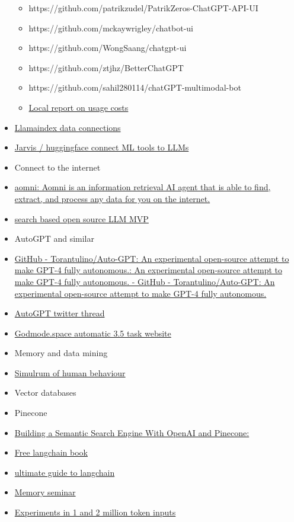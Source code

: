\begin{itemize}
  \begin{itemize}
   
  \item
    https://github.com/patrikzudel/PatrikZeros-ChatGPT-API-UI
  \item
    https://github.com/mckaywrigley/chatbot-ui
  \item
    https://github.com/WongSaang/chatgpt-ui
  \item
    https://github.com/ztjhz/BetterChatGPT
  \item
    https://github.com/sahil280114/chatGPT-multimodal-bot
  \item
    \href{https://llm.report/}{Local report on usage costs}
  \end{itemize}
\item
  \href{https://github.com/jerryjliu/llama_index}{Llamaindex data
  connections}
\item
  \href{https://arxiv.org/pdf/2303.17580.pdf}{Jarvis / huggingface
  connect ML tools to LLMs}
\item
  Connect to the internet
\item
  \href{https://www.aomni.com/}{aomni: Aomni is an information retrieval
  AI agent that is able to find, extract, and process any data for you
  on the internet.}
\item
  \href{https://github.com/michaelthwan/searchGPT}{search based open
  source LLM MVP}
\item
  AutoGPT and similar
\item
  \href{https://github.com/Torantulino/Auto-GPT}{GitHub -
  Torantulino/Auto-GPT: An experimental open-source attempt to make
  GPT-4 fully autonomous.: An experimental open-source attempt to make
  GPT-4 fully autonomous. - GitHub - Torantulino/Auto-GPT: An
  experimental open-source attempt to make GPT-4 fully autonomous.}
\item
  \href{https://mobile.twitter.com/SullyOmarr/status/1645482778677452805}{AutoGPT
  twitter thread}
\item
  \href{https://godmode.space/}{Godmode.space automatic 3.5 task
  website}
\item
  Memory and data mining
\item
  \href{https://arxiv.org/abs/2304.03442}{Simulrum of human behaviour}
\item
  Vector databases
\item
  Pinecone
\item
  \href{https://sigmoidprime.com/post/searchthearxiv/}{Building a
  Semantic Search Engine With OpenAI and Pinecone:}
\item
  \href{https://leanpub.com/langchain/read}{Free langchain book}
\item
  \href{https://www.activeloop.ai/resources/ultimate-guide-to-lang-chain-deep-lake-build-chat-gpt-to-answer-questions-on-your-financial-data/}{ultimate
  guide to langchain}
\item
  \href{https://github.com/Oneirocom/Academy/blob/main/week3/_overview.md}{Memory
  seminar}
\item
  \href{https://arxiv.org/abs/2304.11062}{Experiments in 1 and 2 million
  token inputs}


\end{itemize}
